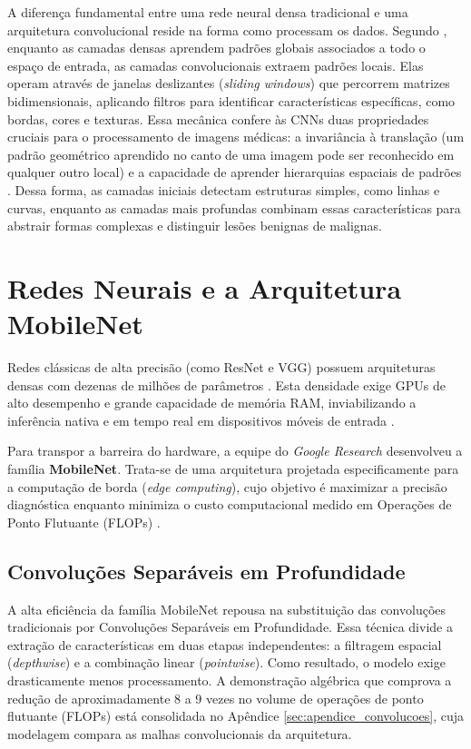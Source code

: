\documentclass[oneside,english,brazilian]{UNISINOSmonografia}
\begin{document}
A diferença fundamental entre uma rede neural densa tradicional e uma arquitetura convolucional reside na forma como processam os dados. Segundo , enquanto as camadas densas aprendem padrões globais associados a todo o espaço de entrada, as camadas convolucionais extraem padrões locais. Elas operam através de janelas deslizantes (\textit{sliding windows}) que percorrem matrizes bidimensionais, aplicando filtros para identificar características específicas, como bordas, cores e texturas. Essa mecânica confere às CNNs duas propriedades cruciais para o processamento de imagens médicas: a invariância à translação (um padrão geométrico aprendido no canto de uma imagem pode ser reconhecido em qualquer outro local) e a capacidade de aprender hierarquias espaciais de padrões \cite{chollet2021deep}. Dessa forma, as camadas iniciais detectam estruturas simples, como linhas e curvas, enquanto as camadas mais profundas combinam essas características para abstrair formas complexas e distinguir lesões benignas de malignas.

\section{Redes Neurais e a Arquitetura MobileNet}

Redes clássicas de alta precisão (como ResNet e VGG) possuem arquiteturas densas com dezenas de milhões de parâmetros \cite{he2016deep, simonyan2014very}. Esta densidade exige GPUs de alto desempenho e grande capacidade de memória RAM, inviabilizando a inferência nativa e em tempo real em dispositivos móveis de entrada \cite{howard2017mobilenets_google}.

Para transpor a barreira do hardware, a equipe do \textit{Google Research} desenvolveu a família \textbf{MobileNet}. Trata-se de uma arquitetura projetada especificamente para a computação de borda (\textit{edge computing}), cujo objetivo é maximizar a precisão diagnóstica enquanto minimiza o custo computacional medido em Operações de Ponto Flutuante (FLOPs) \cite{howard2017mobilenets_google}.

\subsection{Convoluções Separáveis em Profundidade}

A alta eficiência da família MobileNet repousa na substituição das convoluções tradicionais por Convoluções Separáveis em Profundidade. Essa técnica divide a extração de características em duas etapas independentes: a filtragem espacial (\textit{depthwise}) e a combinação linear (\textit{pointwise}). Como resultado, o modelo exige drasticamente menos processamento. A demonstração algébrica que comprova a redução de aproximadamente 8 a 9 vezes no volume de operações de ponto flutuante (FLOPs) está consolidada no Apêndice \ref{sec:apendice_convolucoes}, cuja modelagem compara as malhas convolucionais da arquitetura.
\end{document}
